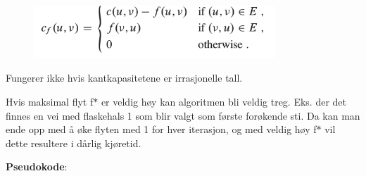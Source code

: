 \documentclass[12pt]{report}
\begin{document}

\begin{figure}[H]
	\begin{Center}
		\includegraphics[width=3.56in,height=0.78in]{./media/image142.png}
	\end{Center}
\end{figure}



\tab \par

Fungerer ikke hvis kantkapasitetene er irrasjonelle tall. \par

Hvis maksimal flyt f$\ast$  er veldig høy kan algoritmen bli veldig treg. Eks. der det finnes en vei med flaskehals 1 som blir valgt som første forøkende sti. Da kan man ende opp med å øke flyten med 1 for hver iterasjon, og med veldig høy f$\ast$  vil dette resultere i dårlig kjøretid. \par


\vspace{\baselineskip}
{\fontsize{13pt}{15.6pt}\selectfont \textbf{Pseudokode}:\par}\par


\vspace{\baselineskip}
\end{document}
